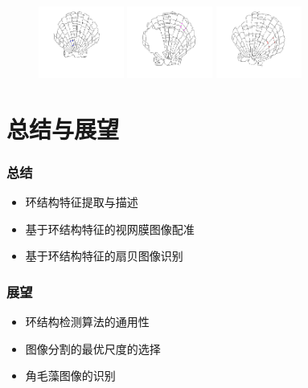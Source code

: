 \documentclass[notheorems,mathserif,table,compress]{beamer}  %
\begin{document}
\begin{frame}
\begin{figure}
  \begin{minipage}[b]{0.3\textwidth}
    \centering
    \includegraphics[width=2.8cm]{chap04/suoxiao}
    \end{minipage}
  \begin{minipage}[b]{0.3\textwidth}
    \centering
    \includegraphics[width=2.8cm]{chap04/zhegai}
    \end{minipage}
  \begin{minipage}[b]{0.3\textwidth}
    \centering
    \includegraphics[width=2.8cm]{chap04/xuanzhuan}
    \end{minipage}
\caption*{\color{blue}{扇贝参考图像与待识别图像中匹配的环结构}}
\end{figure}
\begin{center}
\color{red} 
\end{center}
\end{frame}


\section{总结与展望}
\begin{frame}
\frametitle{总结}
\begin{itemize}
\item 环结构特征提取与描述
\vspace{2mm}
\item 基于环结构特征的视网膜图像配准
\vspace{2mm}
\item 基于环结构特征的扇贝图像识别
\end{itemize}
\end{frame}

\begin{frame}
\frametitle{展望}
\begin{itemize}
\item 环结构检测算法的通用性
\vspace{2mm}
\item 图像分割的最优尺度的选择
\vspace{2mm}
\item 角毛藻图像的识别
\end{itemize}
\end{frame}

\begin{frame}
\begin{center}
\huge{}
\end{center}
\end{frame}
\end{document}
